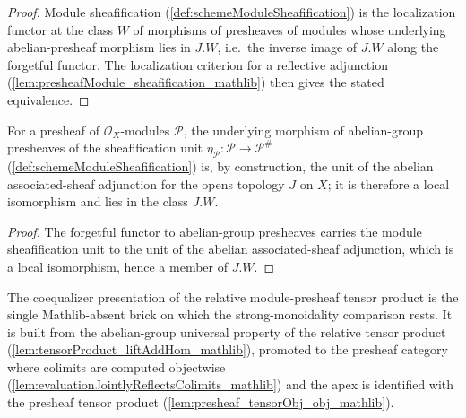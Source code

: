 \begin{proof}
  Module sheafification (\cref{def:schemeModuleSheafification}) is the localization
  functor at the class \(W\) of morphisms of presheaves of modules whose underlying
  abelian-presheaf morphism lies in \(J.W\), i.e.\ the inverse image of \(J.W\) along
  the forgetful functor. The localization criterion for a reflective adjunction
  (\cref{lem:presheafModule_sheafification_mathlib}) then gives the stated
  equivalence.
\end{proof}


\begin{lemma}
  \label{lem:localIso_toPresheaf_map_unit}
  For a presheaf of \(\mathcal{O}_X\)-modules \(\mathcal{P}\), the underlying
  morphism of abelian-group presheaves of the sheafification unit
  \(\eta_{\mathcal{P}} : \mathcal{P} \to \mathcal{P}^{\#}\)
  (\cref{def:schemeModuleSheafification}) is, by construction, the unit of the
  abelian associated-sheaf adjunction for the opens topology \(J\) on \(X\); it is
  therefore a local isomorphism and lies in the class \(J.W\).
\end{lemma}

\begin{proof}
  The forgetful functor to abelian-group presheaves carries the module
  sheafification unit to the unit of the abelian associated-sheaf adjunction, which
  is a local isomorphism, hence a member of \(J.W\).
\end{proof}













The coequalizer presentation of the relative module-presheaf tensor product is
the single Mathlib-absent brick on which the strong-monoidality comparison rests.
It is built from the abelian-group universal property of the relative tensor
product (\cref{lem:tensorProduct_liftAddHom_mathlib}), promoted to the presheaf
category where colimits are computed objectwise
(\cref{lem:evaluationJointlyReflectsColimits_mathlib}) and the apex is identified
with the presheaf tensor product (\cref{lem:presheaf_tensorObj_obj_mathlib}).

